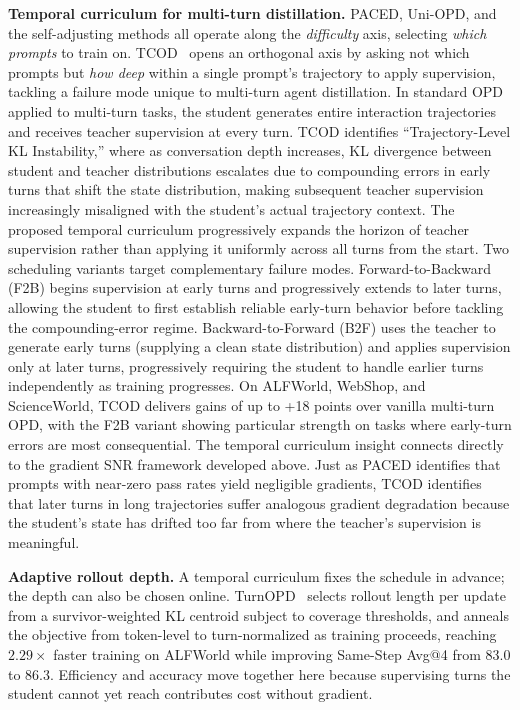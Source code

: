 \documentclass{article} %
\begin{document}
\textbf{Temporal curriculum for multi-turn distillation.} PACED, Uni-OPD, and the self-adjusting methods all operate along the \emph{difficulty} axis, selecting \emph{which prompts} to train on. TCOD~\citep{2604.24005} opens an orthogonal axis by asking not which prompts but \emph{how deep} within a single prompt's trajectory to apply supervision, tackling a failure mode unique to multi-turn agent distillation. In standard OPD applied to multi-turn tasks, the student generates entire interaction trajectories and receives teacher supervision at every turn. TCOD identifies ``Trajectory-Level KL Instability,'' where as conversation depth increases, KL divergence between student and teacher distributions escalates due to compounding errors in early turns that shift the state distribution, making subsequent teacher supervision increasingly misaligned with the student's actual trajectory context. The proposed temporal curriculum progressively expands the horizon of teacher supervision rather than applying it uniformly across all turns from the start. Two scheduling variants target complementary failure modes. Forward-to-Backward (F2B) begins supervision at early turns and progressively extends to later turns, allowing the student to first establish reliable early-turn behavior before tackling the compounding-error regime. Backward-to-Forward (B2F) uses the teacher to generate early turns (supplying a clean state distribution) and applies supervision only at later turns, progressively requiring the student to handle earlier turns independently as training progresses. On ALFWorld, WebShop, and ScienceWorld, TCOD delivers gains of up to +18 points over vanilla multi-turn OPD, with the F2B variant showing particular strength on tasks where early-turn errors are most consequential. The temporal curriculum insight connects directly to the gradient SNR framework developed above. Just as PACED identifies that prompts with near-zero pass rates yield negligible gradients, TCOD identifies that later turns in long trajectories suffer analogous gradient degradation because the student's state has drifted too far from where the teacher's supervision is meaningful.

\textbf{Adaptive rollout depth.} A temporal curriculum fixes the schedule in advance; the depth can also be chosen online. TurnOPD~\citep{2607.05804} selects rollout length per update from a survivor-weighted KL centroid subject to coverage thresholds, and anneals the objective from token-level to turn-normalized as training proceeds, reaching $2.29\times$ faster training on ALFWorld while improving Same-Step Avg@4 from $83.0$ to $86.3$. Efficiency and accuracy move together here because supervising turns the student cannot yet reach contributes cost without gradient.
\end{document}
